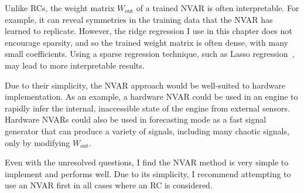 Unlike RCs, the weight matrix $W_\text{out}$ of a trained NVAR is
often interpretable. For example, it can reveal symmetries in the
training data that the NVAR has learned to replicate. However, the
ridge regression I use in this chapter does not encourage sparsity,
and so the trained weight matrix is often dense, with many small
coefficients. Using a sparse regression technique, such as Lasso
regression~\cite{tibshirani1996}, may lead to more
interpretable results.

Due to their simplicity, the NVAR approach would be well-suited
to hardware implementation. As an example, a hardware NVAR could be
used in an engine to rapidly infer the internal, inaccessible state of
the engine from external sensors. Hardware NVARs could also be used in
forecasting mode as a fast signal generator that can produce a variety
of signals, including many chaotic signals, only by modifying $W_\text{out}$.

Even with the unresolved questions, I find the NVAR method is very
simple to implement and performs well. Due to its simplicity, I
recommend attempting to use an NVAR first in all cases where an RC is
considered.
